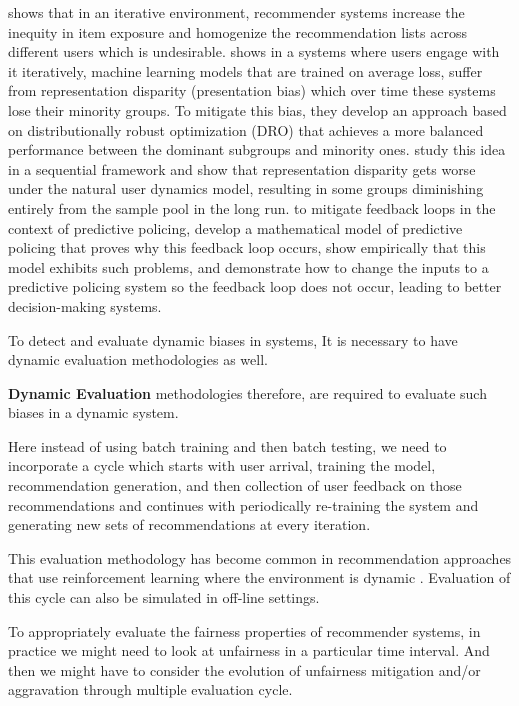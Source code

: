     \cite{Chaney2018Homo} shows that in an iterative environment, recommender systems increase the inequity in item exposure and homogenize the recommendation lists across different users which is undesirable. \cite{pmlr-v80-hashimoto18a} shows in a systems where users engage with it iteratively, machine learning models that are trained on average loss, suffer from representation disparity (presentation bias) which over time these systems lose their minority groups. To mitigate this bias, they develop an approach based on distributionally robust optimization (DRO) that achieves a more balanced performance between the dominant subgroups and minority ones. \cite{NEURIPS2019_7690dd4d} study this idea in a sequential framework and show that representation disparity gets worse under the natural user dynamics model, resulting in some groups diminishing entirely from the sample pool in the long run. to mitigate feedback loops in the context of predictive policing, \cite{pmlr-v81-ensign18a} develop a mathematical model of predictive policing that proves why this feedback loop occurs, show empirically that this model exhibits such problems, and demonstrate how to change the inputs to a predictive policing system so the feedback loop does not occur, leading to better decision-making systems.
    
    To detect and evaluate dynamic biases in systems, It is necessary to have dynamic evaluation methodologies as well.
    
    \textbf{Dynamic Evaluation} methodologies therefore, are required to evaluate such biases in a dynamic system.
    
    Here instead of using batch training and then batch testing, we need to incorporate a cycle which starts with user arrival, training the model, recommendation generation, and then collection of user feedback on those recommendations and continues with periodically re-training the system and generating new sets of recommendations at every iteration.
    
    This evaluation methodology has become common in recommendation approaches that use reinforcement learning where the environment is dynamic \cite{Lihong2010bandit,Zheng2018DRN}. Evaluation of this cycle can also be simulated in off-line settings.  
    
    To appropriately evaluate the fairness properties of recommender systems, in practice we might need to look at unfairness in a particular time interval. And then we might have to consider the evolution of unfairness mitigation and/or aggravation through multiple evaluation cycle.
    
